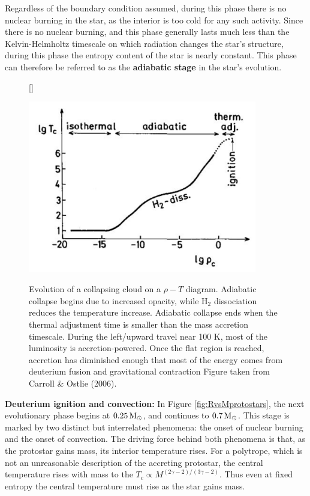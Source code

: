 \documentclass[a4paper,10pt]{article}
\begin{document}
{\noindent}Regardless of the boundary condition assumed, during this phase there is no nuclear burning in the star, as the interior is too cold for any such activity. Since there is no nuclear burning, and this phase generally lasts much less than the Kelvin-Helmholtz timescale on which radiation changes the star's structure, during this phase the entropy content of the star is nearly constant. This phase can therefore be referred to as the \textbf{adiabatic stage} in the star's evolution.

\begin{figure}[t]
    [\FBwidth]
    {\caption{\footnotesize{Evolution of a collapsing cloud on a $\rho-T$ diagram. Adiabatic collapse begins due to increased opacity, while H$_2$ dissociation reduces the temperature increase. Adiabatic collapse ends when the thermal adjustment time is smaller than the mass accretion timescale. During the left/upward travel near 100 K, most of the luminosity is accretion-powered. Once the flat region is reached, accretion has diminished enough that most of the energy comes from deuterium fusion and gravitational contraction Figure taken from Carroll \& Ostlie (2006).}}
    \label{fig:tvsrhoprotostars}}
    {\includegraphics[width=10cm]{figures/Tvsrho_protostars}}
\end{figure}

{\noindent}\textbf{Deuterium ignition and convection:} In Figure \ref{fig:RvsMprotostars}, the next evolutionary phase begins at $0.25\,{\rm M_\odot}$, and continues to $0.7\,{\rm M_\odot}$. This stage is marked by two distinct but interrelated phenomena: the onset of nuclear burning and the onset of convection. The driving force behind both phenomena is that, as the protostar gains mass, its interior temperature rises. For a polytrope, which is not an unreasonable description of the accreting protostar, the central temperature rises with mass to the $T_c\propto M^{(2\gamma-2)/(3\gamma-2)}$. Thus even at fixed entropy the central temperature must rise as the star gains mass.
\end{document}
